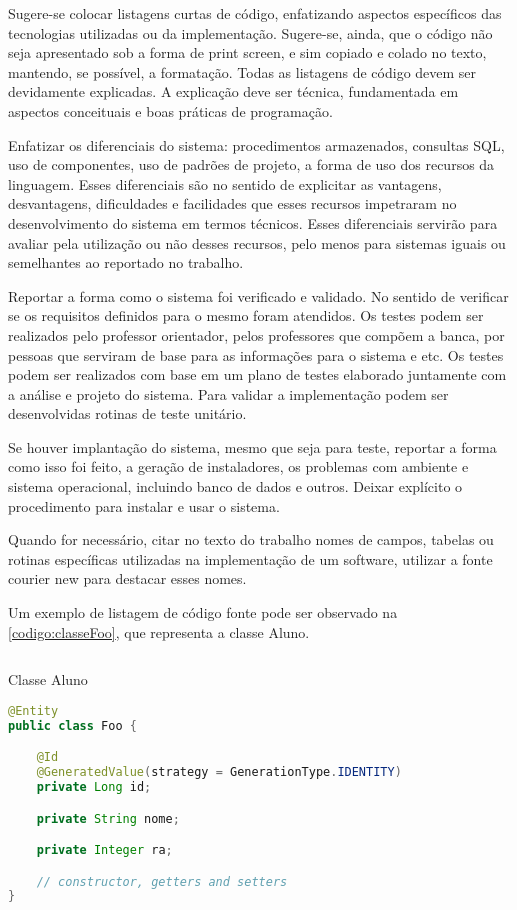 Sugere-se colocar listagens curtas de código, enfatizando aspectos específicos das tecnologias utilizadas ou da implementação. Sugere-se, ainda, que o código não seja apresentado sob a forma de print screen, e sim copiado e colado no texto, mantendo, se possível, a formatação. Todas as listagens de código devem ser devidamente explicadas. A explicação deve ser técnica, fundamentada em aspectos conceituais e boas práticas de programação.

Enfatizar os diferenciais do sistema: procedimentos armazenados, consultas SQL, uso de componentes, uso de padrões de projeto, a forma de uso dos recursos da linguagem. Esses diferenciais são no sentido de explicitar as vantagens, desvantagens, dificuldades e facilidades que esses recursos impetraram no desenvolvimento do sistema em termos técnicos. Esses diferenciais servirão para avaliar pela utilização ou não desses recursos, pelo menos para sistemas iguais ou semelhantes ao reportado no trabalho.

Reportar a forma como o sistema foi verificado e validado. No sentido de verificar se os requisitos definidos para o mesmo foram atendidos. Os testes podem ser realizados pelo professor orientador, pelos professores que compõem a banca, por pessoas que serviram de base para as informações para o sistema e etc. Os testes podem ser realizados com base em um plano de testes elaborado juntamente com a análise e projeto do sistema. Para validar a implementação podem ser desenvolvidas rotinas de teste unitário.

Se houver implantação do sistema, mesmo que seja para teste, reportar a forma como isso foi feito, a geração de instaladores, os problemas com ambiente e sistema operacional, incluindo banco de dados e outros. Deixar explícito o procedimento para instalar e usar o sistema.

Quando for necessário, citar no texto do trabalho nomes de campos, tabelas ou rotinas específicas utilizadas na implementação de um software, utilizar a fonte courier new para destacar esses nomes.

Um exemplo de listagem de código fonte pode ser observado na \autoref{codigo:classeFoo}, que representa a classe Aluno.

\begin{sourcecode}[htb]
  \caption{\label{codigo:classeFoo}Classe Aluno}
  \begin{lstlisting}[frame=single, language=Java]
@Entity
public class Foo {

    @Id
    @GeneratedValue(strategy = GenerationType.IDENTITY)
    private Long id;

    private String nome;

    private Integer ra;

    // constructor, getters and setters
}
\end{lstlisting}
  \fonte{}
\end{sourcecode}

